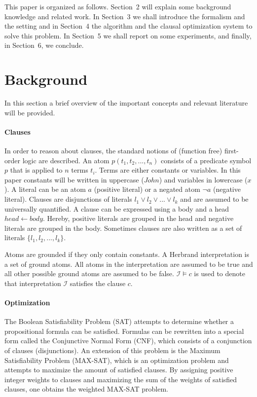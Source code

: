 \documentclass[letterpaper]{article}
\newcommand{\sym}[1]{\ensuremath{\mathcal{#1}}}
\theoremstyle{definition}
\begin{document}
This paper is organized as follows.
Section~2 will explain some background knowledge and related work.
In Section~3 we shall introduce the formalism and the setting and in Section~4 the algorithm and the clausal optimization system to solve this problem.
In Section~5 we shall report on some experiments, and finally, in Section~6, we conclude.


\section{Background}
In this section a brief overview of the important concepts and relevant literature will be provided.

\paragraph{Clauses}
In order to reason about clauses, the standard notions of (function free) first-order logic are described.
An atom $p(t_1, t_2, ..., t_n)$ consists of a predicate symbol $p$ that is applied to $n$ terms $t_i$.
Terms are either constants or variables.
In this paper constants will be written in uppercase ($\mathit{John}$) and variables in lowercase ($\mathit{x}$).
A literal can be an atom $a$ (positive literal) or a negated atom $\lnot a$ (negative literal).
Clauses are disjunctions of literals $l_1 \lor l_2 \lor ... \lor l_k$ and are assumed to be universally quantified.
A clause can be expressed using a body and a head $\mathit{head} \leftarrow \mathit{body}$.
Hereby, positive literals are grouped in the head and negative literals are grouped in the body.
Sometimes clauses are also written as a set of literals $\{l_1, l_2, ..., l_k\}$.

Atoms are grounded if they only contain constants.
A Herbrand interpretation is a set of ground atoms.
All atoms in the interpretation are assumed to be true and all other possible ground atoms are assumed to be false.
$\sym{I} \models c$ is used to denote that interpretation \sym{I} satisfies the clause $c$.

\paragraph{Optimization}
The Boolean Satisfiability Problem (SAT) attempts to determine whether a propositional formula can be satisfied.
Formulas can be rewritten into a special form called the Conjunctive Normal Form (CNF), which consists of a conjunction of clauses (disjunctions).
An extension of this problem is the Maximum Satisfiability Problem (MAX-SAT), which is an optimization problem and attempts to maximize the amount of satisfied clauses.
By assigning positive integer weights to clauses and maximizing the sum of the weights of satisfied clauses, one obtains the weighted MAX-SAT problem.
\end{document}
